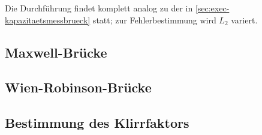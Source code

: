 Die Durchführung findet komplett analog zu der in \autoref{sec:exec-kapazitaetsmessbrueck} statt; zur
Fehlerbestimmung wird $L_2$ variert.

\subsection{Maxwell-Brücke}
\label{sec:exec-maxwell-bruecke}

\subsection{Wien-Robinson-Brücke}
\label{sec:exec-wien-robinson-bruecke}

\subsection{Bestimmung des Klirrfaktors}
\label{sec:exec-klirrfaktors}
